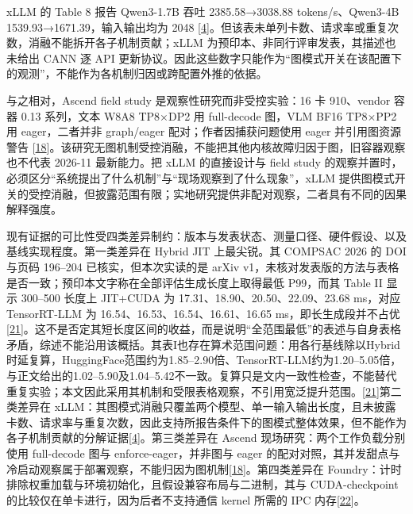 \documentclass[
  UTF8,
  zihao=5]{ctexart}
\begin{document}
xLLM 的 Table 8 报告 Qwen3-1.7B 吞吐 2385.58→3038.88 tokens/s、Qwen3-4B
1539.93→1671.39，输入输出均为 2048
{[}\protect\hyperlink{ref-liu2025xllm}{4}{]}。但该表未单列卡数、请求率或重复次数，消融不能拆开各子机制贡献；xLLM
为预印本、非同行评审发表，其描述也未给出 CANN 逐 API
更新协议。因此这些数字只能作为``图模式开关在该配置下的观测''，不能作为各机制归因或跨配置外推的依据。

与之相对，Ascend field study 是观察性研究而非受控实验：16 卡 910、vendor
容器 0.13 系列，文本 W8A8 TP8×DP2 用 full-decode 图，VLM BF16 TP8×PP2 用
eager，二者并非 graph/eager 配对；作者因捕获问题使用 eager
并引用图资源警告
{[}\protect\hyperlink{ref-yu2026ascendfield}{18}{]}。该研究无图机制受控消融，不能把其他内核故障归因于图，旧容器观察也不代表
2026-11 最新能力。把 xLLM 的直接设计与 field study
的观察并置时，必须区分``系统提出了什么机制''与``现场观察到了什么现象''，xLLM
提供图模式开关的受控消融，但披露范围有限；实地研究提供非配对观察，二者具有不同的因果解释强度。

现有证据的可比性受四类差异制约：版本与发表状态、测量口径、硬件假设、以及基线实现程度。第一类差异在
Hybrid JIT 上最尖锐。其 COMPSAC 2026 的 DOI 与页码 196--204
已核实，但本次实读的是 arXiv
v1，未核对发表版的方法与表格是否一致；预印本文字称在全部评估生成长度上取得最低
P99，而其 Table II 显示 300--500 长度上 JIT+CUDA 为
17.31、18.90、20.50、22.09、23.68 ms，对应 TensorRT-LLM 为
16.54、16.53、16.54、16.61、16.65
ms，即长生成段并不占优{[}\protect\hyperlink{ref-yadav2026hybridpreprint}{21}{]}。这不是否定其短长度区间的收益，而是说明``全范围最低''的表述与自身表格矛盾，综述不能沿用该概括。其表I也存在算术范围问题：用各行基线除以Hybrid时延复算，HuggingFace范围约为1.85--2.90倍、TensorRT-LLM约为1.20--5.05倍，与正文给出的1.02--5.90及1.04--5.42不一致。复算只是文内一致性检查，不能替代重复实验；本文因此采用其机制和受限表格观察，不引用宽泛提升范围。{[}\protect\hyperlink{ref-yadav2026hybridpreprint}{21}{]}第二类差异在
xLLM：其图模式消融只覆盖两个模型、单一输入输出长度，且未披露卡数、请求率与重复次数，因此支持所报告条件下的图模式整体效果，但不能作为各子机制贡献的分解证据{[}\protect\hyperlink{ref-liu2025xllm}{4}{]}。第三类差异在
Ascend 现场研究：两个工作负载分别使用 full-decode 图与
enforce-eager，并非图与 eager
的配对对照，其并发甜点与冷启动观察属于部署观察，不能归因为图机制{[}\protect\hyperlink{ref-yu2026ascendfield}{18}{]}。第四类差异在
Foundry：计时排除权重加载与环境初始化，且假设兼容布局与二进制，其与
CUDA-checkpoint 的比较仅在单卡进行，因为后者不支持通信 kernel 所需的 IPC
内存{[}\protect\hyperlink{ref-liu2026foundry}{22}{]}。
\end{document}
